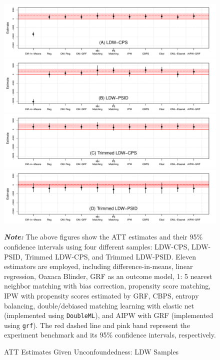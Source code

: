 \documentclass[letterpaper,12pt,leqno]{article}
\begin{document}
\begin{figure}[!ht]
    \caption{ATT Estimates Given Unconfoundedness: LDW Samples}\label{fig:ldw.att}
    \vspace{-1em}
    \begin{minipage}[c]{1\textwidth}
    \begin{center}
    \includegraphics[width=0.8\linewidth]{coef_ldw_cps.pdf}
    \includegraphics[width=0.8\linewidth]{coef_ldw_psid.pdf}
    \includegraphics[width=0.8\linewidth]{coef_ldw_cps_trim.pdf}
    \includegraphics[width=0.8\linewidth]{coef_ldw_psid_trim.pdf}
    \end{center}    
     {\footnotesize\textbf{\textit{Note:}} The above figures show the ATT estimates and their 95\% confidence intervals using four different samples: LDW-CPS, LDW-PSID, Trimmed LDW-CPS, and Trimmed LDW-PSID. Eleven estimators are employed, including difference-in-means, linear regression, Oaxaca Blinder, GRF as an outcome model, 1: 5 nearest neighbor matching with bias correction, propensity score matching, IPW with propensity scores estimated by GRF, CBPS, entropy balancing, double/debiased matching learning with elastic net (implemented using \texttt{DoubleML}), and AIPW with GRF  (implemented using \texttt{grf}). The red dashed line and pink band represent the experiment benchmark and its 95\% confidence intervals, respectively.}
     \end{minipage}
\end{figure}
\end{document}
